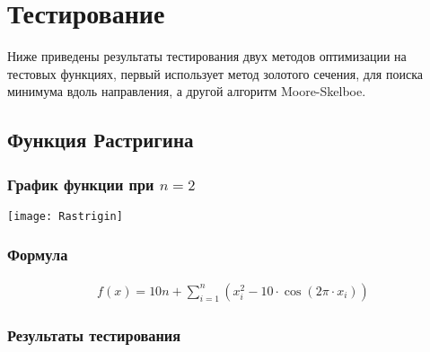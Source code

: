 \section{Тестирование}
    Ниже приведены результаты тестирования двух методов оптимизации на тестовых функциях, первый использует метод золотого сечения, для поиска минимума вдоль направления, а другой алгоритм Moore-Skelboe.

    \subsection*{Функция Растригина}

    \subsubsection*{График функции при $n=2$}
    \texttt{[image: Rastrigin]}

    \subsubsection*{Формула}
    \begin{gather*}
        f(x)=10 n+\sum_{i=1}^n\left(x_i^2-10 \cdot \cos \left(2 \pi \cdot x_i\right)\right)
    \end{gather*}

    \subsubsection*{Результаты тестирования}

